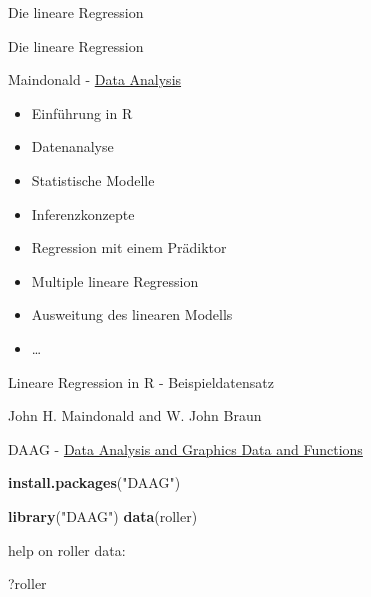\documentclass[ignorenonframetext,]{beamer}
\newenvironment{Shaded}{}{}
\newcommand{\KeywordTok}[1]{\textcolor[rgb]{0.00,0.44,0.13}{\textbf{{#1}}}}
\newcommand{\StringTok}[1]{\textcolor[rgb]{0.25,0.44,0.63}{{#1}}}
\newcommand{\NormalTok}[1]{{#1}}
\providecommand{\tightlist}{%
\setlength{\itemsep}{0pt}\setlength{\parskip}{0pt}}
\begin{document}
\begin{frame}{Die lineare Regression}

\end{frame}

\begin{frame}{Die lineare Regression}

Maindonald -
\href{https://cran.r-project.org/doc/contrib/usingR.pdf}{Data Analysis}

\begin{itemize}
\tightlist
\item
  Einführung in R
\item
  Datenanalyse
\item
  Statistische Modelle
\item
  Inferenzkonzepte
\item
  Regression mit einem Prädiktor
\item
  Multiple lineare Regression
\item
  Ausweitung des linearen Modells
\item
  \ldots{}
\end{itemize}

\end{frame}

\begin{frame}[fragile]{Lineare Regression in R - Beispieldatensatz}

John H. Maindonald and W. John Braun

DAAG -
\href{http://cran.ms.unimelb.edu.au/web/packages/DAAG/DAAG.pdf}{Data
Analysis and Graphics Data and Functions}

\begin{Shaded}
\begin{Highlighting}[]
\KeywordTok{install.packages}\NormalTok{(}\StringTok{"DAAG"}\NormalTok{)}
\end{Highlighting}
\end{Shaded}

\begin{Shaded}
\begin{Highlighting}[]
\KeywordTok{library}\NormalTok{(}\StringTok{"DAAG"}\NormalTok{)}
\KeywordTok{data}\NormalTok{(roller)}
\end{Highlighting}
\end{Shaded}

help on roller data:

\begin{Shaded}
\begin{Highlighting}[]
\NormalTok{?roller}
\end{Highlighting}
\end{Shaded}

\end{frame}
\end{document}
